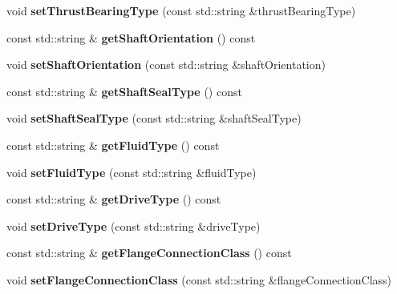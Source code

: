 \begin{DoxyCompactItemize}
void {\bfseries set\+Thrust\+Bearing\+Type} (const std\+::string \&thrust\+Bearing\+Type)
\item 
\mbox{\label{class_pump_data_a464fa11e8a727f2393cf392331d36f01}} 
const std\+::string \& {\bfseries get\+Shaft\+Orientation} () const
\item 
\mbox{\label{class_pump_data_a54e4d9914a3aeeb3762b9566188e9311}} 
void {\bfseries set\+Shaft\+Orientation} (const std\+::string \&shaft\+Orientation)
\item 
\mbox{\label{class_pump_data_a10202d2818dbc618b9a6c1ffb4de6385}} 
const std\+::string \& {\bfseries get\+Shaft\+Seal\+Type} () const
\item 
\mbox{\label{class_pump_data_a15ce808feb633f5fae6f990564e1f6c9}} 
void {\bfseries set\+Shaft\+Seal\+Type} (const std\+::string \&shaft\+Seal\+Type)
\item 
\mbox{\label{class_pump_data_ab9cc38d08711bf15bd82694e57f62251}} 
const std\+::string \& {\bfseries get\+Fluid\+Type} () const
\item 
\mbox{\label{class_pump_data_ab67c5664ae173ce0f431787feecc450a}} 
void {\bfseries set\+Fluid\+Type} (const std\+::string \&fluid\+Type)
\item 
\mbox{\label{class_pump_data_a2ec8f1a19e9371f0274da3ccd5ab48f6}} 
const std\+::string \& {\bfseries get\+Drive\+Type} () const
\item 
\mbox{\label{class_pump_data_add02f3bff0ba5557f96e73b3abf7d563}} 
void {\bfseries set\+Drive\+Type} (const std\+::string \&drive\+Type)
\item 
\mbox{\label{class_pump_data_ae8ccd3945d656ee50361e8e699e02986}} 
const std\+::string \& {\bfseries get\+Flange\+Connection\+Class} () const
\item 
\mbox{\label{class_pump_data_a70d000d403967dbd7f0808e5f9454967}} 
void {\bfseries set\+Flange\+Connection\+Class} (const std\+::string \&flange\+Connection\+Class)
\item 

\end{DoxyCompactItemize}
